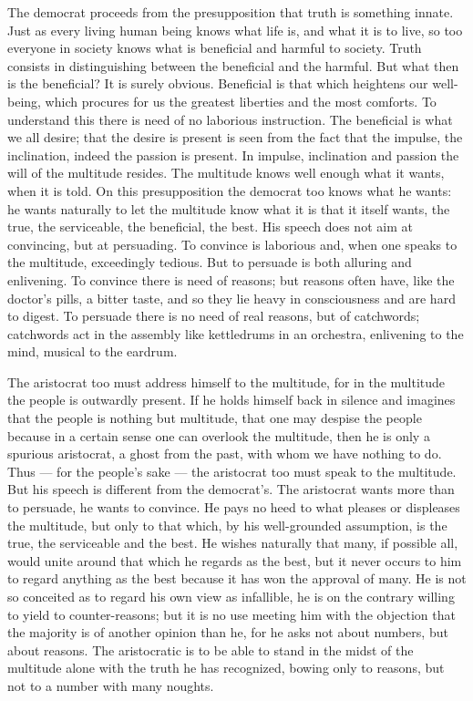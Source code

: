\documentclass[12pt,a4paper,openany]{book}
\newcommand{\opage}[1]{\marginnote{\footnotesize\textit{[#1]}}}
\begin{document}
The democrat proceeds from the presupposition that
truth is something innate. Just as every living
human being knows what life is, and what it is to live,
so too everyone in society knows what is
beneficial and harmful to society. Truth consists
in distinguishing between the beneficial and the harmful.
But what then is the beneficial? It is surely
\setcounter{footnote}{0}%
\opage{82}obvious. Beneficial is that which heightens our well-being, which
procures for us the greatest liberties and the most comforts.
To understand this there is need of no laborious
instruction. The beneficial is what we all
desire; that the desire is present is seen from the fact that the impulse,
the inclination, indeed the passion is present. In impulse,
inclination and passion the will of the multitude resides.
The multitude knows well enough what it wants, when it is
told. On this presupposition the democrat
too knows what he wants: he wants naturally to let
the multitude know what it is that it itself wants, the
true, the serviceable, the beneficial, the best. His
speech does not aim at convincing, but at
persuading. To convince is laborious and, when one
speaks to the multitude, exceedingly tedious. But to
persuade is both alluring and enlivening. To convince
there is need of reasons; but reasons often have,
like the doctor's pills, a bitter taste, and so they lie
heavy in consciousness and are hard to digest.
To persuade there is no need of real reasons, but of
catchwords; catchwords act in the assembly like kettledrums in
an orchestra, enlivening to the mind, musical to
the eardrum.

The aristocrat too must address himself to the multitude,
for in the multitude the people is outwardly present. If he
holds himself back in silence and imagines that the people
is nothing but multitude, that one may despise
the people because in a certain sense one can overlook
the multitude, then he is only a spurious aristocrat, a
ghost from the past, with whom we have nothing
to do. Thus --- for the people's sake --- the
aristocrat too must speak to the multitude. But his speech is
\setcounter{footnote}{0}%
\opage{83}different from the democrat's. The aristocrat wants more than to
persuade, he wants to convince. He pays no heed to
what pleases or displeases the multitude, but only to
that which, by his well-grounded assumption, is
the true, the serviceable and the best. He wishes naturally
that many, if possible all, would unite
around that which he regards as the best, but it
never occurs to him to regard anything as the best
because it has won the approval of many. He is not
so conceited as to regard his own view as infallible,
he is on the contrary willing to yield to counter-reasons;
but it is no use meeting him with the objection
that the majority is of another opinion than he, for
he asks not about numbers, but about reasons. The aristocratic
is to be able to stand in the midst of the multitude alone with
the truth he has recognized, bowing only to reasons,
but not to a number with many noughts.
\end{document}
